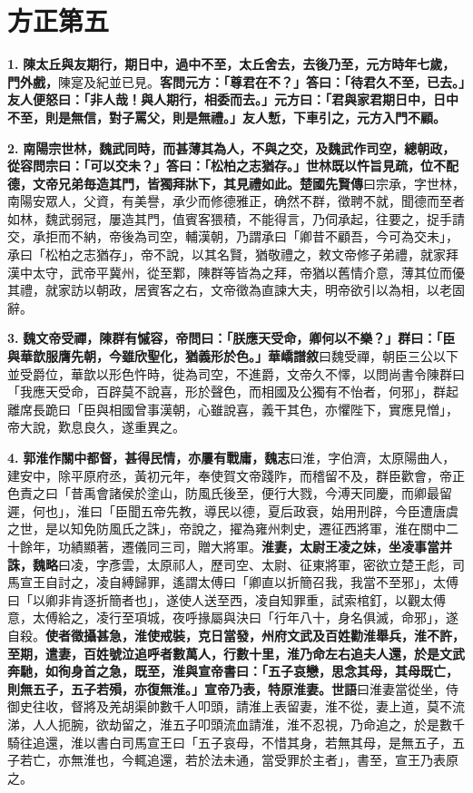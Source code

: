 \chapter{方正第五}

\textbf{1.} \textbf{陳太丘與友期行，期日中，過中不至，太丘舍去，去後乃至，元方時年七歲，門外戲，}{\footnotesize 陳寔及紀並已見。}\textbf{客問元方：「尊君在不？」答曰：「待君久不至，已去。」友人便怒曰：「非人哉！與人期行，相委而去。」元方曰：「君與家君期日中，日中不至，則是無信，對子罵父，則是無禮。」友人慙，下車引之，元方入門不顧。}

\textbf{2.} \textbf{南陽宗世林，魏武同時，而甚薄其為人，不與之交，及魏武作司空，總朝政，從容問宗曰：「可以交未？」答曰：「松柏之志猶存。」世林既以忤旨見疏，位不配德，文帝兄弟毎造其門，皆獨拜牀下，其見禮如此。}{\footnotesize \textbf{楚國先賢傳}曰宗承，字世林，南陽安眾人，父資，有美譽，承少而修德雅正，确然不群，徵聘不就，聞德而至者如林，魏武弱冠，屢造其門，值賓客猥積，不能得言，乃伺承起，往要之，捉手請交，承拒而不納，帝後為司空，輔漢朝，乃謂承曰「卿昔不顧吾，今可為交未」，承曰「松柏之志猶存」，帝不說，以其名賢，猶敬禮之，敕文帝修子弟禮，就家拜漢中太守，武帝平冀州，從至鄴，陳群等皆為之拜，帝猶以舊情介意，薄其位而優其禮，就家訪以朝政，居賓客之右，文帝徵為直諫大夫，明帝欲引以為相，以老固辭。}

\textbf{3.} \textbf{魏文帝受禪，陳群有慽容，帝問曰：「朕應天受命，卿何以不樂？」群曰：「臣與華歆服膺先朝，今雖欣聖化，猶義形於色。」}{\footnotesize \textbf{華嶠譜敘}曰魏受禪，朝臣三公以下並受爵位，華歆以形色忤時，徙為司空，不進爵，文帝久不懌，以問尚書令陳群曰「我應天受命，百辟莫不說喜，形於聲色，而相國及公獨有不怡者，何邪」，群起離席長跪曰「臣與相國曾事漢朝，心雖說喜，義干其色，亦懼陛下，實應見憎」，帝大說，歎息良久，遂重異之。}

\textbf{4.} \textbf{郭淮作關中都督，甚得民情，亦屢有戰庸，}{\footnotesize \textbf{魏志}曰淮，字伯濟，太原陽曲人，建安中，除平原府丞，黃初元年，奉使賀文帝踐阼，而稽留不及，群臣歡會，帝正色責之曰「昔禹會諸侯於塗山，防風氏後至，便行大戮，今溥天同慶，而卿最留遲，何也」，淮曰「臣聞五帝先教，導民以德，夏后政衰，始用刑辟，今臣遭唐虞之世，是以知免防風氏之誅」，帝說之，擢為雍州刺史，遷征西將軍，淮在關中二十餘年，功績顯著，遷儀同三司，贈大將軍。}\textbf{淮妻，太尉王凌之妹，坐凌事當并誅，}{\footnotesize \textbf{魏略}曰凌，字彥雲，太原祁人，歷司空、太尉、征東將軍，密欲立楚王彪，司馬宣王自討之，凌自縛歸罪，遙謂太傅曰「卿直以折簡召我，我當不至邪」，太傅曰「以卿非肯逐折簡者也」，遂使人送至西，凌自知罪重，試索棺釘，以觀太傅意，太傅給之，凌行至項城，夜呼掾屬與決曰「行年八十，身名俱滅，命邪」，遂自殺。}\textbf{使者徵攝甚急，淮使戒裝，克日當發，州府文武及百姓勸淮舉兵，淮不許，至期，遣妻，百姓號泣追呼者數萬人，行數十里，淮乃命左右追夫人還，於是文武奔馳，如徇身首之急，既至，淮與宣帝書曰：「五子哀戀，思念其母，其母既亡，則無五子，五子若殞，亦復無淮。」宣帝乃表，特原淮妻。}{\footnotesize \textbf{世語}曰淮妻當從坐，侍御史往收，督將及羌胡渠帥數千人叩頭，請淮上表留妻，淮不從，妻上道，莫不流涕，人人扼腕，欲劫留之，淮五子叩頭流血請淮，淮不忍視，乃命追之，於是數千騎往追還，淮以書白司馬宣王曰「五子哀母，不惜其身，若無其母，是無五子，五子若亡，亦無淮也，今輒追還，若於法未通，當受罪於主者」，書至，宣王乃表原之。}


